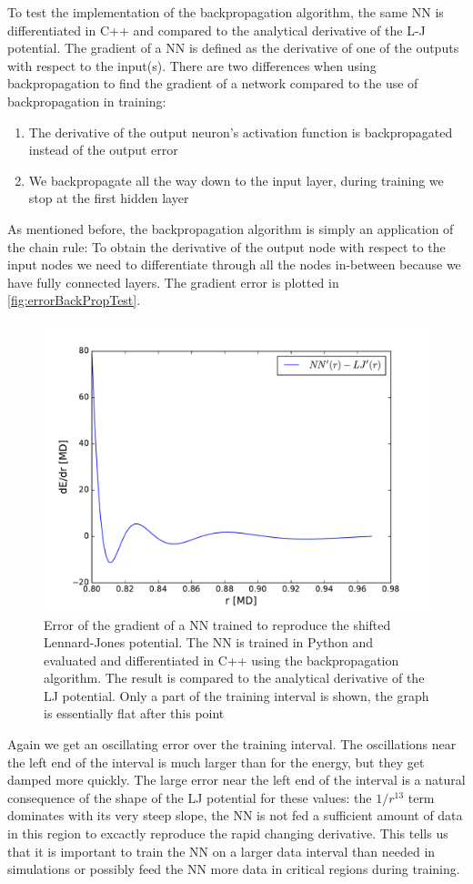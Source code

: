 \documentclass[twoside,english]{uiofysmaster}
\begin{document}
To test the implementation of the backpropagation algorithm, the
same NN is differentiated in C++ and compared to the analytical derivative of the L-J potential. 
The gradient of a NN is defined as the derivative of one of the outputs with respect to the input(s). 
There are two differences when using backpropagation to find the gradient of a network compared
to the use of backpropagation in training:
\begin{enumerate}
 \item The derivative of the output neuron's activation function is backpropagated instead of the output error
 \item We backpropagate all the way down to the input layer, during training we stop at the first hidden layer
\end{enumerate}
As mentioned before, the backpropagation algorithm is simply an application of the chain rule: 
To obtain the derivative of the output node with respect to the input nodes we need to differentiate through
all the nodes in-between because we have fully connected layers. The gradient error is plotted in 
\autoref{fig:errorBackPropTest}.
\begin{figure}[H]
\centering
  \includegraphics[width = 0.9\linewidth]{Figures/Tests/errorDerivative.pdf}
  \caption{Error of the gradient of a NN trained to reproduce the shifted Lennard-Jones potential.
	   The NN is trained in Python and evaluated and differentiated in C++ using the backpropagation algorithm.
	   The result is compared to the analytical derivative of the LJ potential. Only a part of the training
	   interval is shown, the graph is essentially flat after this point} 
  \label{fig:errorBackPropTest}
\end{figure}
Again we get an oscillating error over the training interval. The oscillations near the left end of the interval is much larger
than for the energy, but they get damped more quickly. The large error near the left end of the interval is a natural
consequence of the shape of the LJ potential for these values: the $1/r^{13}$ term dominates with its very steep slope, the NN is not 
fed a sufficient amount of data in this region to excactly reproduce the rapid changing derivative. 
This tells us that it is important to train the NN on a larger data interval than needed in simulations or possibly
feed the NN more data in critical regions during training. 
\end{document}
